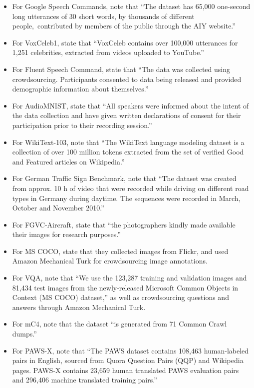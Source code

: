 \documentclass{article}
\begin{document}
\begin{itemize}
    \item For Google Speech Commands, \citet{speechcommandsv2} note that ``The dataset has 65,000 one-second long utterances of 30 short words, by thousands of different people, contributed by members of the public through the AIY website.''
    \item For VoxCeleb1, \citet{Nagrani17} state that ``VoxCeleb contains over 100,000 utterances for 1,251 celebrities, extracted from videos uploaded to YouTube.''
    \item For Fluent Speech Command, \citet{Lugosch2019SpeechMP} state that ``The data was collected using crowdsourcing. Participants consented to data being released and provided demographic information about themselves.''
    \item For AudioMNIST,  \citet{becker2018interpreting} state that ``All speakers were informed about the intent of the data collection and have given written declarations of consent for their participation prior to their recording session.''
    \item For WikiText-103,  \citet{Merity2017PointerSM} note that ``The WikiText language modeling dataset is a collection of over 100 million tokens extracted from the set of verified Good and Featured articles on Wikipedia.''
    \item For German Traffic Sign Benchmark, \citet{Houben-IJCNN-2013} note that ``The dataset was created from approx. 10 h of video that were recorded while driving on different road types in Germany during daytime. The sequences were recorded in March, October and November 2010.''
    \item For FGVC-Aircraft, \citet{maji13fine-grained} state that ``the photographers kindly made available their images for research purposes.''
    \item For MS COCO, \citet{Lin2014MicrosoftCC} state that they collected images from Flickr, and used Amazon Mechanical Turk for crowdsourcing image annotations.
    \item For VQA, \citet{Agrawal2015VQAVQ} note that  ``We use the 123,287 training and validation images and 81,434 test images from the newly-released Microsoft Common Objects in Context (MS COCO) dataset,'' as well as crowdsourcing questions and answers through Amazon Mechanical Turk.
    \item For mC4, \citet{2019t5} note that the dataset ``is generated from 71 Common Crawl dumps.''
    \item For PAWS-X, \citet{pawsx2019emnlp} note that ``The PAWS dataset contains 108,463 human-labeled pairs in English, sourced from Quora Question Pairs (QQP) and Wikipedia pages. PAWS-X contains 23,659 human translated PAWS evaluation pairs and 296,406 machine translated training pairs.''
    
    
\end{itemize}
\end{document}
